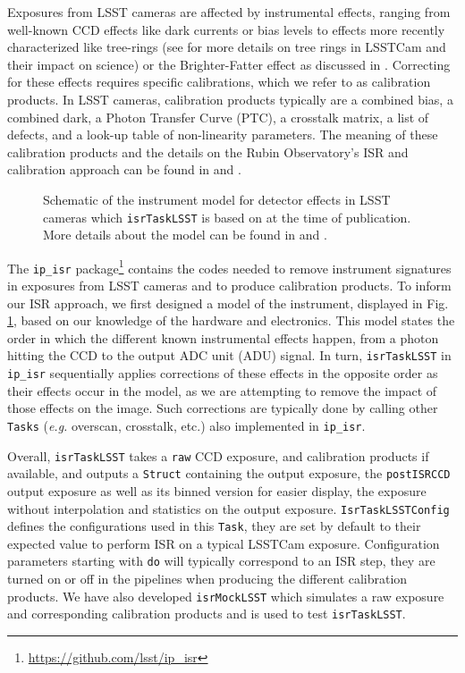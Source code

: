 Exposures from LSST cameras are affected by instrumental effects, ranging from well-known CCD effects like dark currents or bias levels to effects more recently characterized like tree-rings (see \citet{2017JInst..12C5015P,2020JATIS...6a1005P,2023PASP..135k5003E,2015JInst..10C8010O,2016ApJ...825...61O} for more details on tree rings in LSSTCam and their impact on science) or the Brighter-Fatter effect as discussed in \cite{2024PASP..136d5003B}.
Correcting for these effects requires specific calibrations, which we refer to as calibration products. In LSST cameras, calibration products typically are a combined bias, a combined dark, a Photon Transfer Curve (PTC), a crosstalk matrix, a list of defects, and a look-up table of non-linearity parameters.
The meaning of these calibration products and the details on the Rubin Observatory's ISR and calibration approach can be found in \citet{2024arXiv240414516P} and \citep{SITCOMTN-086}.
\begin{figure}
    \caption{Schematic of the instrument model for detector effects in LSST cameras which \texttt{isrTaskLSST} is based on at the time of publication. More details about the model can be found in \citet{SITCOMTN-086} and \citet{ 2024arXiv240414516P}.}
    \label{fig:isr_model}
\end{figure}

The \texttt{ip\_isr} package\footnote{\url{https://github.com/lsst/ip_isr}} contains the codes needed to remove instrument signatures in exposures from LSST cameras and to produce calibration products.
To inform our ISR approach, we first designed a model of the instrument, displayed in Fig. \ref{fig:isr_model}, based on our knowledge of the hardware and electronics.
This model states the order in which the different known instrumental effects happen, from a photon hitting the CCD to the output ADC unit (ADU) signal.
In turn, \texttt{isrTaskLSST} in \texttt{ip\_isr} sequentially applies corrections of these effects in the opposite order as their effects occur in the model, as we are attempting to remove the impact of those effects on the image. Such corrections are typically done by calling other \texttt{Tasks} (\textit{e.g.} overscan, crosstalk, etc.) also implemented in \texttt{ip\_isr}.


Overall, \texttt{isrTaskLSST} takes a \texttt{raw} CCD exposure, and calibration products if available, and outputs a \texttt{Struct} containing the output exposure, the \texttt{postISRCCD} output exposure as well as its binned version for easier display, the exposure without interpolation and statistics on the output exposure.
\texttt{IsrTaskLSSTConfig} defines the configurations used in this \texttt{Task}, they are set by default to their expected value to perform ISR on a typical LSSTCam exposure. Configuration parameters starting with \texttt{do} will typically correspond to an ISR step, they are turned on or off in the pipelines when producing the different calibration products.
We have also developed \texttt{isrMockLSST} which simulates a raw exposure and corresponding calibration products and is used to test \texttt{isrTaskLSST}.


